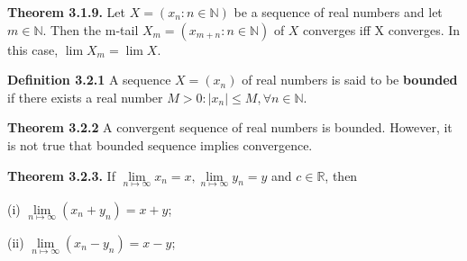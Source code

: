 \documentclass[10pt,landscape]{article}
\begin{document}
\begin{multicols}{4}







\textbf{Theorem 3.1.9.} Let $X = (x_n : n \in \mathbb{N})$ be a sequence of real numbers and let $m \in \mathbb{N}$. Then the m-tail $X_m = (x_{m+n} : n \in \mathbb{N})$ of $X$ converges iff X converges. In this case, $\lim X_m = \lim X$.




\textbf{Definition 3.2.1} A sequence $X = (x_n)$ of real numbers is said to be \textbf{bounded} if there exists a real number $M > 0: |x_n| \leq M, \forall n \in \mathbb{N}$.

\textbf{Theorem 3.2.2} A convergent sequence of real numbers is bounded. However, it is not true that bounded sequence implies convergence.

\textbf{Theorem 3.2.3.} If $\underset{n \mapsto \infty}{\lim} x_n = x, \underset{n \mapsto \infty}{\lim} y_n = y$ and $c \in \mathbb{R}$, then 

(i) $\underset{n \mapsto \infty}{\lim} (x_n + y_n) = x + y$;

(ii) $\underset{n \mapsto \infty}{\lim} (x_n - y_n) = x - y$;


\end{multicols}
\end{document}
